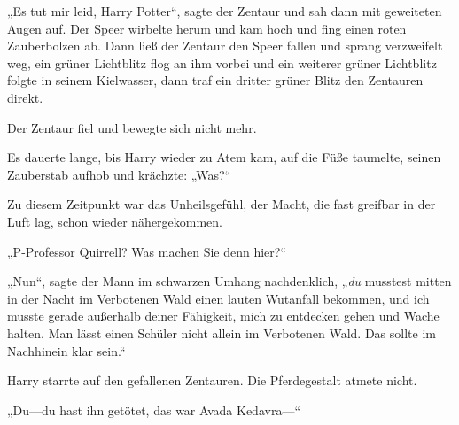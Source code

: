 „Es tut mir leid, Harry Potter“, sagte der Zentaur und sah dann mit geweiteten Augen auf. Der Speer wirbelte herum und kam hoch und fing einen roten Zauberbolzen ab. Dann ließ der Zentaur den Speer fallen und sprang verzweifelt weg, ein grüner Lichtblitz flog an ihm vorbei und ein weiterer grüner Lichtblitz folgte in seinem Kielwasser, dann traf ein dritter grüner Blitz den Zentauren direkt.

Der Zentaur fiel und bewegte sich nicht mehr.

Es dauerte lange, bis Harry wieder zu Atem kam, auf die Füße taumelte, seinen Zauberstab aufhob und krächzte: „Was?“

Zu diesem Zeitpunkt war das Unheilsgefühl, der Macht, die fast greifbar in der Luft lag, schon wieder nähergekommen.

„P-Professor Quirrell? Was machen Sie denn hier?“

„Nun“, sagte der Mann im schwarzen Umhang nachdenklich, „\emph{du} musstest mitten in der Nacht im Verbotenen Wald einen lauten Wutanfall bekommen, und ich musste gerade außerhalb deiner Fähigkeit, mich zu entdecken gehen und Wache halten. Man lässt einen Schüler nicht allein im Verbotenen Wald. Das sollte im Nachhinein klar sein.“

Harry starrte auf den gefallenen Zentauren. Die Pferdegestalt atmete nicht.

„Du—du hast ihn getötet, das war Avada Kedavra—“

